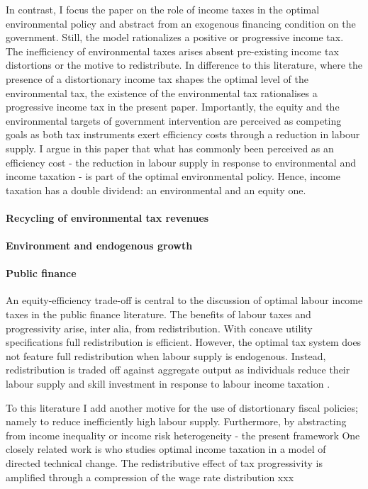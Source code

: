 In contrast, I focus the paper on the role of income taxes in the optimal environmental policy and abstract from an exogenous financing condition on the government. Still, the model rationalizes a positive or progressive income tax.
 The inefficiency of environmental taxes arises absent pre-existing income tax distortions or the motive to redistribute.
In difference to this literature, where the presence of a distortionary income tax shapes the optimal level of the environmental tax, the existence of the environmental tax rationalises a progressive income tax in the present paper.
Importantly, the equity and the environmental targets of government intervention are perceived as competing goals as both tax instruments exert efficiency costs through a reduction in labour supply. 
I argue in this paper that what has commonly been perceived as an efficiency cost -  the reduction in labour supply in response to environmental and income taxation - is part of the optimal environmental policy. Hence, income taxation has a double dividend: an environmental and an equity one.  


\paragraph{Recycling of environmental tax revenues}
\paragraph{Environment and endogenous growth}

\paragraph{Public finance}
An equity-efficiency trade-off is central to the discussion of optimal labour income taxes in the public finance literature.  The benefits of labour taxes and progressivity arise, inter alia, from redistribution. %
With concave utility specifications full redistribution is efficient. However, the optimal tax system does not feature full redistribution when labour supply is endogenous. Instead, redistribution is traded off against aggregate output as individuals reduce their labour supply and skill investment in response to labour income taxation \citep{Heathcote2017OptimalFramework, Conesa2009TaxingAll, Domeij2004OnTaxes}.

To this literature I add another motive for the use of distortionary fiscal policies; namely to reduce inefficiently high labour supply. Furthermore, by abstracting from income inequality or income risk heterogeneity - the present framework
One closely related work is \cite{Loebbing2019NationalChange} who studies optimal income taxation in a model of directed technical change. The redistributive effect of tax progressivity is amplified through a compression of the wage rate distribution xxx